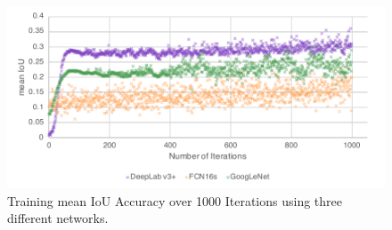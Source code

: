 \begin{figure}
	\centering
	\includegraphics[width=\textwidth]{figures/experiments/network-comparison.pdf}
		\caption[Network Comparison Chart]{Training mean IoU Accuracy over 1000 Iterations using three different networks.}
		\label{chart:experiments-networkcomparison}
\end{figure}